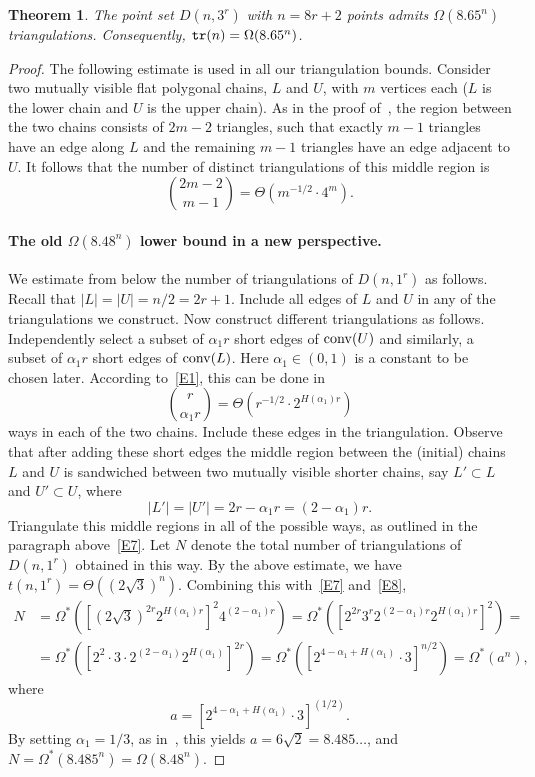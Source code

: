\documentclass[11pt]{article}
\newtheorem{theorem}{Theorem}
\newcommand{\conv}{{\rm conv}}
\def\tr{{\tt tr}}
\begin{document}
\begin{theorem} \label{T1}
The point set $D(n,3^r)$ with $n=8r+2$ points admits $\Omega(8.65^n)$ triangulations.
Consequently, $\tr(n)=\Omega(8.65^n)$.
\end{theorem}
\begin{proof}
The following estimate is used in all our triangulation bounds.
Consider two mutually visible flat polygonal chains, $L$ and $U$, with $m$
vertices each ($L$ is the lower chain and $U$ is the upper chain). As
in the proof of~\cite[Theorem 4.1]{GNT00}, the region between the two
chains consists of $2m-2$ triangles, such that exactly $m-1$ triangles
have an edge along $L$ and the remaining $m-1$ triangles have an edge adjacent to $U$.
It follows that the number of distinct triangulations of this middle region is
\begin{equation} \label{E7}
{2m-2 \choose m-1} = \Theta(m^{-1/2} \cdot 4^m).
\end{equation}

\paragraph{The old $\Omega(8.48^n)$ lower bound in a new perspective.}
We estimate from below the number of triangulations of $D(n,1^r)$ as
follows. Recall that $|L|=|U|=n/2=2r+1$. Include all edges of $L$ and $U$
in any of the triangulations we construct.
Now construct different triangulations as follows. Independently
select a subset of $\alpha_1 r$ short edges of $\conv(U)$ and
similarly, a subset of $\alpha_1 r$ short edges of $\conv(L)$. Here
$\alpha_1 \in (0,1)$ is a constant to be chosen later.
According to~\eqref{E1}, this can be done in
$$ {r \choose \alpha_1 r} = \Theta(r^{-1/2} \cdot 2^{H(\alpha_1) r}) $$
ways in each of the two chains. Include these edges in the triangulation.
Observe that after adding these short edges the middle region between
the (initial) chains $L$ and $U$ is sandwiched between two
mutually visible shorter chains, say $L' \subset L$ and $U' \subset U$, where
\begin{equation} \label{E8}
|L'|=|U'|=2r-\alpha_1 r=(2-\alpha_1)r.
\end{equation}
Triangulate this middle regions in all of the possible ways,
as outlined in the paragraph above~\eqref{E7}. Let $N$
denote the total number of triangulations of $D(n,1^r)$ obtained in this way.
By the above estimate, we have $t(n,1^r) =\Theta((2 \sqrt{3})^n)$.
Combining this with~\eqref{E7} and~\eqref{E8},
\begin{align*} \label{E9}
N &= \Omega^* \left( \left[(2 \sqrt{3})^{2r} 2^{H(\alpha_1) r} \right]^2
4^{(2-\alpha_1)r} \right)=
\Omega^* \left(
\left[ 2^{2r} 3^r 2^{(2-\alpha_1)r} 2^{H(\alpha_1) r} \right]^2
\right) =
\nonumber \\
&= \Omega^* \left(
\left[ 2^{2} \cdot 3 \cdot 2^{(2-\alpha_1)} 2^{H(\alpha_1)} \right]^{2r}
\right) =
\Omega^* \left(
\left[ 2^{4-\alpha_1+H(\alpha_1)}\cdot 3 \right]^{n/2} \right) =
\Omega^* \left( a^n\right),
\end{align*}
where
$$ a=\left[ 2^{4-\alpha_1+H(\alpha_1)}\cdot 3 \right]^{(1/2)}.$$
By setting $\alpha_1=1/3$, as in~\cite{AHV+06}, this yields
$a= 6 \sqrt{2}= 8.485\ldots$, and $N = \Omega^*(8.485^n)=\Omega(8.48^n)$.


\end{proof}
\end{document}
